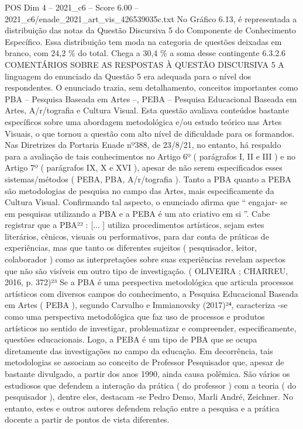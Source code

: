 \begin{textsample}{POS Dim 4 – 2021\_c6 – Score 6.00 – 2021\_c6/enade\_2021\_art\_vis\_426539035c.txt}
No Gráfico 6.13, é representada a distribuição das notas da Questão Discursiva 5 do Componente de Conhecimento Específico.
Essa distribuição tem moda na categoria de questões deixadas em branco, com 24,2 \% do total.
Chega a 30,4 \% a soma desse contingente 6.3.2.6 COMENTÁRIOS SOBRE AS RESPOSTAS À QUESTÃO DISCURSIVA 5 A linguagem do enunciado da Questão 5 era adequada para o nível dos respondentes.
O enunciado trazia, sem detalhamento, conceitos importantes como PBA – Pesquisa Baseada em Artes –, PEBA – Pesquisa Educacional Baseada em Artes, A/r/tografia e Cultura Visual.
Esta questão avaliava conteúdos bastante específicos sobre uma abordagem metodológica e/ou estudo teórico nas Artes Visuais, o que tornou a questão com alto nível de dificuldade para os formandos.
Nas Diretrizes da Portaria Enade nº388, de 23/8/21, no entanto, há respaldo para a avaliação de tais conhecimentos no Artigo 6º ( parágrafos I, II e III ) e no Artigo 7º ( parágrafos IX, X e XVI ), apesar de não serem especificados esses sistemas/métodos ( PEBA, PBA, A/r/tografia ).
Tanto a PBA quanto a PEBA são metodologias de pesquisa no campo das Artes, mais especificamente da Cultura Visual.
Confirmando tal aspecto, o enunciado afirma que “ engajar- se em pesquisas utilizando a PBA e a PEBA é um ato criativo em si ”.
Cabe registrar que a PBA²² : [... ] utiliza procedimentos artísticos, sejam estes literários, cênicos, visuais ou performativos, para dar conta de práticas de experiências, mas que tanto os diferentes sujeitos ( pesquisador, leitor, colaborador ) como as interpretações sobre suas experiências revelam aspectos que não são visíveis em outro tipo de investigação. ( OLIVEIRA ; CHARREU, 2016, p. 372)²³ Se a PBA é uma perspectiva metodológica que articula processos artísticos com diversos campos do conhecimento, a Pesquisa Educacional Baseada em Artes ( PEBA ), segundo Carvalho e Immianovsky (2017)²⁴, caracteriza -se como uma perspectiva metodológica que faz uso de processos e produtos artísticos no sentido de investigar, problematizar e compreender, especificamente, questões educacionais.
Logo, a PEBA é um tipo de PBA que se ocupa diretamente das investigações no campo da educação.
Em decorrência, tais metodologias se associam ao conceito de Professor Pesquisador que, apesar de bastante divulgado, a partir dos anos 1990, ainda causa polêmica.
São vários os estudiosos que defendem a interação da prática ( do professor ) com a teoria ( do pesquisador ), dentre eles, destacam -se Pedro Demo, Marli André, Zeichner.
No entanto, estes e outros autores defendem relação entre a pesquisa e a prática docente a partir de pontos de vista diferentes.

\end{textsample}
